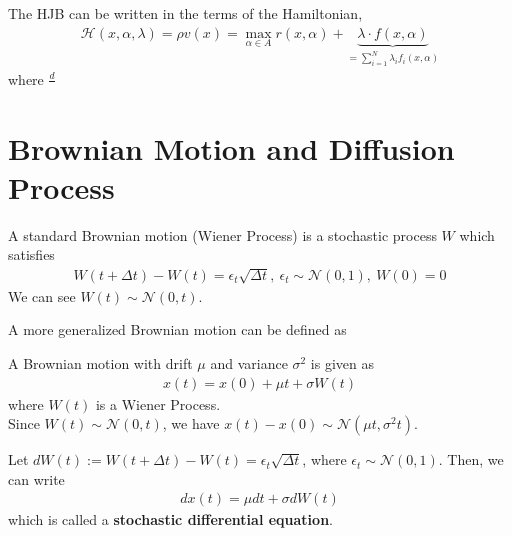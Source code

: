 \documentclass[11pt]{elegantbook}
\begin{document}
\begin{note}
    The HJB can be written in the terms of the Hamiltonian,
    \begin{equation}
        \begin{aligned}
            \mathcal{H}(x,\alpha,\lambda) = \rho v(x) = \max_{\alpha\in A} r(x,\alpha) + \underbrace{\lambda\cdot f(x,\alpha)}_{=\sum_{i=1}^N \lambda_{i} f_i(x,\alpha)}
        \end{aligned}
        \nonumber
    \end{equation}
    where $\frac{d}{}$
\end{note}

\section{Brownian Motion and Diffusion Process}
\begin{definition}
    A standard Brownian motion (Wiener Process) is a stochastic process $W$ which satisfies
    \begin{equation}
        \begin{aligned}
            W(t+\Delta t)-W(t)=\epsilon_t\sqrt{\Delta t},\ \epsilon_t\sim \mathcal{N}(0,1),\ W(0)=0
        \end{aligned}
        \nonumber
    \end{equation}
    We can see $W(t)\sim \mathcal{N}(0,t)$.
\end{definition}
A more generalized Brownian motion can be defined as
\begin{definition}
    A Brownian motion with drift $\mu$ and variance $\sigma^2$ is given as
    \begin{equation}
        \begin{aligned}
            x(t)=x(0)+ \mu t + \sigma W(t)
        \end{aligned}
        \nonumber
    \end{equation}
    where $W(t)$ is a Wiener Process.\\
    Since $W(t)\sim \mathcal{N}(0,t)$, we have $x(t)-x(0)\sim \mathcal{N}(\mu t,\sigma^2 t)$.
\end{definition}
Let $dW(t):=W(t+\Delta t)-W(t)=\epsilon_t\sqrt{\Delta t}$, where $\epsilon_t\sim \mathcal{N}(0,1)$. Then, we can write
\begin{equation}
    \begin{aligned}
        d x(t)= \mu dt + \sigma d W(t)
    \end{aligned}
    \nonumber
\end{equation}
which is called a \textbf{stochastic differential equation}.
\end{document}
